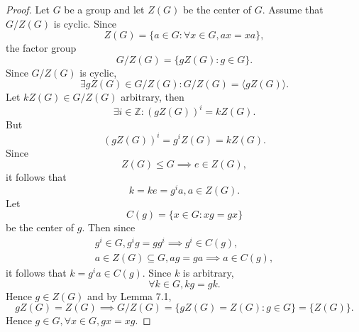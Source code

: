 \documentclass{article}
\theoremstyle{definition}
\begin{document}
     \begin{proof}
        Let $G$ be a group and let $Z(G)$ be the center of $G$. Assume that $G/Z(G)$ is cyclic. Since
        \begin{equation*}
            Z(G) = \{a \in G: \forall x \in G, ax=xa\},
        \end{equation*}
        the factor group
        \begin{equation*}
            G/Z(G) = \{gZ(G): g \in G\}.
        \end{equation*}
        Since $G/Z(G)$ is cyclic,
        \begin{equation*}
            \exists gZ(G) \in G/Z(G): G/Z(G) = \langle gZ(G) \rangle.
        \end{equation*}
        Let $kZ(G) \in G/Z(G)$ arbitrary, then 
        \begin{equation*}
            \exists i \in \mathbb{Z}: (gZ(G))^i = kZ(G).
        \end{equation*}
        But
        \begin{equation*}
            (gZ(G))^i = g^iZ(G) = kZ(G).
        \end{equation*}
        Since
        \begin{equation*}
            Z(G) \leq G \implies e \in Z(G),
        \end{equation*}
        it follows that
        \begin{equation*}
            k = ke = g^ia, a \in Z(G).
        \end{equation*}
        Let
        \begin{equation*}
            C(g) = \{x \in G: xg=gx\}
        \end{equation*}
        be the center of $g$. Then since
        \begin{align*}
            g^i \in G, g^ig=gg^i \implies g^i \in C(g), \\
            a \in Z(G) \subseteq G, ag=ga \implies a \in C(g),
        \end{align*}
        it follows that $k = g^ia \in C(g)$. Since $k$ is arbitrary,
        \begin{equation*}
            \forall k \in G, kg = gk.
        \end{equation*}
        Hence $g \in Z(G)$ and by Lemma 7.1, 
        \begin{equation*}
            gZ(G) = Z(G) \implies G/Z(G) = \{gZ(G) = Z(G): g \in G\} = \{Z(G)\}.
        \end{equation*}
        Hence $g \in G, \forall x \in G, gx=xg$.
     \end{proof}
     
\end{document}
